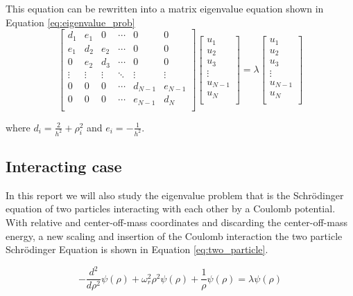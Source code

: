 This equation can be rewritten into a matrix eigenvalue equation shown in Equation \ref{eq:eigenvalue_prob}
\begin{equation}\label{eq:eigenvalue_prob}
\begin{bmatrix}
d_1 & e_1 & 0 & \cdots & 0 & 0\\
e_1 & d_2 & e_2 & \cdots & 0 & 0\\
0 & e_2 & d_3 & \cdots & 0 & 0\\
\vdots & \vdots & \vdots & \ddots & \vdots & \vdots\\
0 & 0 & 0 & \cdots & d_{N-1} & e_{N-1}\\
0 & 0 & 0 & \cdots & e_{N-1} & d_N\\
\end{bmatrix} \begin{bmatrix}
u_1 \\ u_2 \\ u_3 \\ \vdots \\ u_{N-1} \\ u_N \\ 
\end{bmatrix} = \lambda \begin{bmatrix}
u_1 \\ u_2 \\ u_3 \\ \vdots \\ u_{N-1} \\ u_N \\
\end{bmatrix}
\end{equation}

where $d_i = \frac{2}{h^2} + \rho_i^2$ and $e_i = -\frac{1}{h^2}$.

\subsection{Interacting case}

In this report we will also study the eigenvalue problem that is the Schrödinger equation of two particles interacting with each other by a Coulomb potential. With relative and center-off-mass coordinates and discarding the center-off-mass energy, a new scaling and insertion of the Coulomb interaction the two particle Schrödinger Equation is shown in Equation \ref{eq:two_particle}.

\begin{equation}\label{eq:two_particle}
-\frac{d^2}{d\rho^2}\psi (\rho )+ \omega_r^2\rho^2\psi (\rho ) + \frac{1}{\rho}\psi (\rho ) = \lambda \psi (\rho )
\end{equation}

